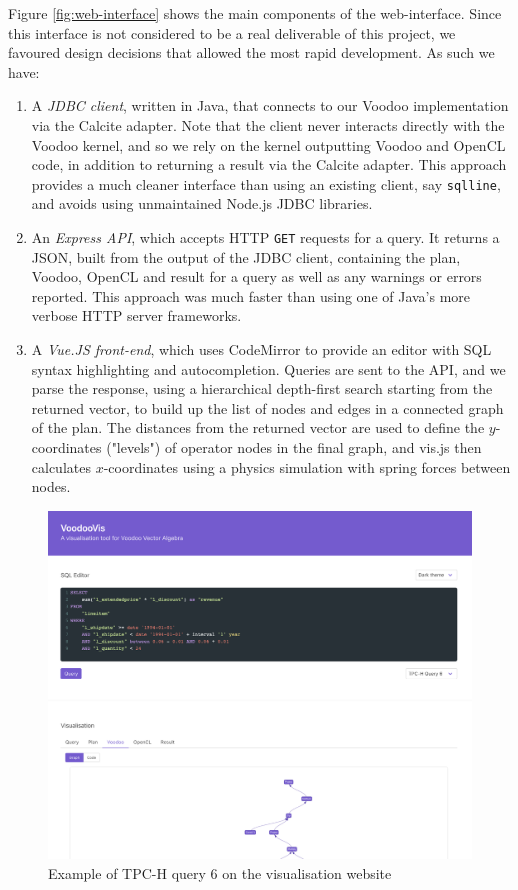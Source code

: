 Figure \ref{fig:web-interface} shows the main components of the web-interface. Since this interface is not considered to be a real deliverable of this project, we favoured design decisions that allowed the most rapid development. As such we have:

\begin{enumerate}
\item A \emph{JDBC client}, written in Java, that connects to our Voodoo implementation via the Calcite adapter. Note that the client never interacts directly with the Voodoo kernel, and so we rely on the kernel outputting Voodoo and OpenCL code, in addition to returning a result via the Calcite adapter. This approach provides a much cleaner interface than using an existing client, say \texttt{sqlline}, and avoids using unmaintained Node.js JDBC libraries.
\item An \emph{Express API}, which accepts HTTP \texttt{GET} requests for a query. It returns a JSON, built from the output of the JDBC client, containing the plan, Voodoo, OpenCL and result for a query as well as any warnings or errors reported. This approach was much faster than using one of Java's more verbose HTTP server frameworks.
\item A \emph{Vue.JS front-end}, which uses CodeMirror to provide an editor with SQL syntax highlighting and autocompletion. Queries are sent to the API, and we parse the response, using a hierarchical depth-first search starting from the returned vector, to build up the list of nodes and edges in a connected graph of the plan. The distances from the returned vector are used to define the $y$-coordinates ("levels") of operator nodes in the final graph, and vis.js then calculates $x$-coordinates using a physics simulation with spring forces between nodes.
\end{enumerate}

\begin{figure}[b!]
    \centering
    \includegraphics[width=0.95\linewidth]{appendix/q6-screenshot.png}
    \caption{Example of TPC-H query 6 on the visualisation website}
    \label{fig:q6-vis}
\end{figure}
